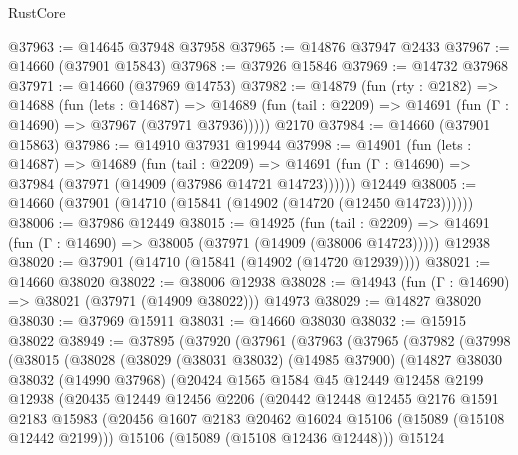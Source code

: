 \begin{lexlean}{RustCore}
\begin{coremodule}
@37963 := @14645 @37948 @37958
@37965 := @14876 @37947 @2433
@37967 := @14660 (@37901 @15843)
@37968 := @37926 @15846
@37969 := @14732 @37968
@37971 := @14660 (@37969 @14753)
@37982 := @14879
    (fun (rty : @2182) =>
    @14688
      (fun (lets : @14687) =>
      @14689 (fun (tail : @2209) => @14691 (fun (Γ : @14690) => @37967 (@37971 @37936)))))
    @2170
@37984 := @14660 (@37901 @15863)
@37986 := @14910 @37931 @19944
@37998 := @14901
    (fun (lets : @14687) =>
    @14689
      (fun (tail : @2209) =>
      @14691 (fun (Γ : @14690) => @37984 (@37971 (@14909 (@37986 @14721 @14723))))))
    @12449
@38005 := @14660 (@37901 (@14710 (@15841 (@14902 (@14720 (@12450 @14723))))))
@38006 := @37986 @12449
@38015 := @14925
    (fun (tail : @2209) => @14691 (fun (Γ : @14690) => @38005 (@37971 (@14909 (@38006 @14723)))))
    @12938
@38020 := @37901 (@14710 (@15841 (@14902 (@14720 @12939))))
@38021 := @14660 @38020
@38022 := @38006 @12938
@38028 := @14943 (fun (Γ : @14690) => @38021 (@37971 (@14909 @38022))) @14973
@38029 := @14827 @38020
@38030 := @37969 @15911
@38031 := @14660 @38030
@38032 := @15915 @38022
@38949 := @37895
    (@37920
      (@37961
        (@37963
          (@37965
            (@37982
              (@37998
                (@38015
                  (@38028
                    (@38029
                      (@38031 @38032)
                      (@14985 @37900)
                      (@14827
                        @38030
                        @38032
                        (@14990 @37968)
                        (@20424
                          @1565
                          @1584
                          @45
                          @12449
                          @12458
                          @2199
                          @12938
                          (@20435
                            @12449
                            @12456
                            @2206
                            (@20442
                              @12448
                              @12455
                              @2176
                              @1591
                              @2183
                              @15983
                              (@20456
                                @1607
                                @2183
                                @20462
                                @16024
                                @15106
                                (@15089 (@15108 @12442 @2199)))
                              @15106
                              (@15089 (@15108 @12436 @12448)))
                            @15124

\end{coremodule}
\end{lexlean}

